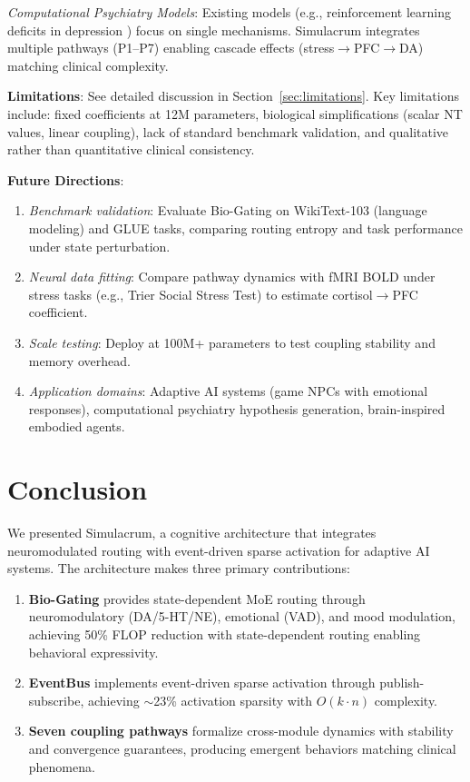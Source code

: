 \documentclass[preprint,12pt]{elsarticle}
\begin{document}
\textit{Computational Psychiatry Models}: Existing models (e.g., reinforcement learning deficits in depression \cite{huys2016}) focus on single mechanisms. Simulacrum integrates multiple pathways (P1--P7) enabling cascade effects (stress$\rightarrow$PFC$\rightarrow$DA) matching clinical complexity.

\textbf{Limitations}: See detailed discussion in Section~\ref{sec:limitations}. Key limitations include: fixed coefficients at 12M parameters, biological simplifications (scalar NT values, linear coupling), lack of standard benchmark validation, and qualitative rather than quantitative clinical consistency.

\textbf{Future Directions}:
\begin{enumerate}
\item \textit{Benchmark validation}: Evaluate Bio-Gating on WikiText-103 (language modeling) and GLUE tasks, comparing routing entropy and task performance under state perturbation.
\item \textit{Neural data fitting}: Compare pathway dynamics with fMRI BOLD under stress tasks (e.g., Trier Social Stress Test) to estimate cortisol$\rightarrow$PFC coefficient.
\item \textit{Scale testing}: Deploy at 100M+ parameters to test coupling stability and memory overhead.
\item \textit{Application domains}: Adaptive AI systems (game NPCs with emotional responses), computational psychiatry hypothesis generation, brain-inspired embodied agents.
\end{enumerate}

\section{Conclusion}
\label{sec:conclusion}

We presented Simulacrum, a cognitive architecture that integrates neuromodulated routing with event-driven sparse activation for adaptive AI systems. The architecture makes three primary contributions:

\begin{enumerate}
\item \textbf{Bio-Gating} provides state-dependent MoE routing through neuromodulatory (DA/5-HT/NE), emotional (VAD), and mood modulation, achieving 50\% FLOP reduction with state-dependent routing enabling behavioral expressivity.

\item \textbf{EventBus} implements event-driven sparse activation through publish-subscribe, achieving $\sim$23\% activation sparsity with $O(k \cdot n)$ complexity.

\item \textbf{Seven coupling pathways} formalize cross-module dynamics with stability and convergence guarantees, producing emergent behaviors matching clinical phenomena.
\end{enumerate}
\end{document}
